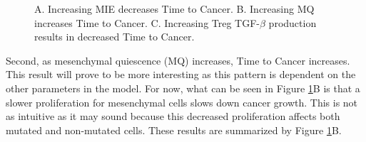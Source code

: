 \documentclass{article}
\begin{document}
\begin{figure}[H]
\center
{}
\caption{A. Increasing MIE decreases Time to Cancer. 
B. Increasing MQ increases Time to Cancer.
C. Increasing Treg TGF-$\beta$ production results in decreased Time to Cancer.
\newline
}
\label{fig:FirstSurvivalCurves}
\end{figure}

Second, as mesenchymal quiescence (MQ) increases, Time to Cancer increases.
This result will prove to be more interesting as this pattern is dependent on the other parameters in the model.
For now, what can be seen in Figure \ref{fig:FirstSurvivalCurves}B is that a slower proliferation for mesenchymal cells slows down cancer growth.
This is not as intuitive as it may sound because this decreased proliferation affects both mutated and non-mutated cells.
These results are summarized by Figure \ref{fig:FirstSurvivalCurves}B.
\end{document}
